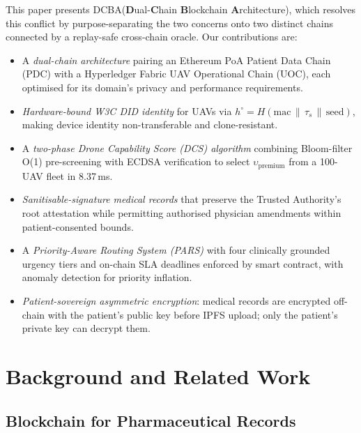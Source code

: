\documentclass[sigplan,screen]{acmart}
\newcommand{\dcba}{\textsc{DCBA}\xspace}
\newcommand{\pdc}{PDC\xspace}
\newcommand{\uoc}{UOC\xspace}
\newcommand{\dcs}{\textsc{DCS}\xspace}
\newcommand{\pars}{\textsc{PARS}\xspace}
\begin{document}
This paper presents \dcba (\textbf{D}ual-\textbf{C}hain
\textbf{B}lockchain \textbf{A}rchitecture), which resolves this conflict by
purpose-separating the two concerns onto two distinct chains connected by
a replay-safe cross-chain oracle.
Our contributions are:

\begin{itemize}
\item[\textbf{C1.}] A \emph{dual-chain architecture} pairing an Ethereum PoA
  Patient Data Chain (\pdc) with a Hyperledger Fabric UAV Operational Chain
  (\uoc), each optimised for its domain's privacy and performance requirements.

\item[\textbf{C2.}] \emph{Hardware-bound W3C DID identity} for UAVs via
  $h^\circ = H(\text{mac} \,\|\, \tau_s \,\|\, \text{seed})$, making device
  identity non-transferable and clone-resistant.

\item[\textbf{C3.}] A \emph{two-phase Drone Capability Score (\dcs) algorithm}
  combining Bloom-filter O(1) pre-screening with ECDSA verification to select
  $\upsilon_{\text{premium}}$ from a 100-UAV fleet in 8.37\,ms.

\item[\textbf{C4.}] \emph{Sanitisable-signature medical records} that preserve
  the Trusted Authority's root attestation while permitting authorised physician
  amendments within patient-consented bounds.

\item[\textbf{C5.}] A \emph{Priority-Aware Routing System (\pars)} with four
  clinically grounded urgency tiers and on-chain SLA deadlines enforced by
  smart contract, with anomaly detection for priority inflation.

\item[\textbf{C6.}] \emph{Patient-sovereign asymmetric encryption}: medical
  records are encrypted off-chain with the patient's public key before IPFS
  upload; only the patient's private key can decrypt them.
\end{itemize}

\section{Background and Related Work}\label{sec:related}

\subsection{Blockchain for Pharmaceutical Records}
\end{document}
